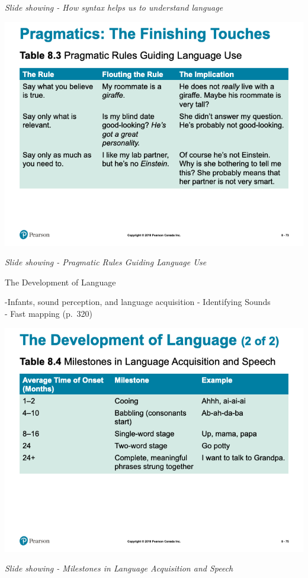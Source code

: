 \documentclass[
]{book}
\begin{document}
\begin{reflect}
\emph{Slide showing - How syntax helps us to understand language}

\includegraphics{assets/unit_1/slide_73.png}

\emph{Slide showing - Pragmatic Rules Guiding Language Use}

The Development of Language

-Infants, sound perception, and language acquisition
- Identifying Sounds\\
- Fast mapping (p.~320)

\includegraphics{assets/unit_1/slide_75.png}

\emph{Slide showing - Milestones in Language Acquisition and Speech}


\end{reflect}
\end{document}
